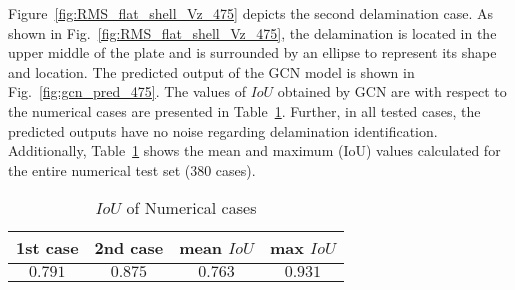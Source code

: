 \documentclass[runningheads]{llncs}
\begin{document}
Figure~\ref{fig:RMS_flat_shell_Vz_475} depicts the second delamination case.
As shown in Fig.~\ref{fig:RMS_flat_shell_Vz_475}, the delamination is located in the upper middle of the plate and is surrounded by an ellipse to represent its shape and location.
The predicted output of the GCN model is shown in Fig.~\ref{fig:gcn_pred_475}.
The values of \(IoU\) obtained by GCN are with respect to the numerical cases are presented in Table~\ref{tab:table_numerical_cases}.
Further, in all tested cases, the predicted outputs have no noise regarding delamination identification.
Additionally, Table~\ref{tab:table_numerical_cases} shows the mean and maximum (IoU) values calculated for the entire numerical test set (380 cases).
\begin{table}[ht!]
	\centering
	\caption{\(IoU\) of Numerical cases}
	\label{tab:table_numerical_cases}
	{
		\begin{tabular}{cc|cc}
			\toprule
			 1st case & 2nd case & mean \(IoU\) & max \(IoU\) \\ 
			 \midrule 
			\(0.791\) & \(0.875\) & \(0.763\) & \(0.931\) \\ 
			\bottomrule
		\end{tabular}
	}
\end{table}
\end{document}
